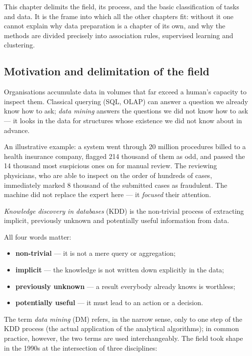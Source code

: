 \documentclass[11pt,a4paper]{article}
\theoremstyle{definition}
\begin{document}
This chapter delimits the field, its process, and the basic classification of tasks and data.
It is the frame into which all the other chapters fit: without it one cannot explain why data
preparation is a chapter of its own, and why the methods are divided precisely into association
rules, supervised learning and clustering.

\subsection{Motivation and delimitation of the field}

Organisations accumulate data in volumes that far exceed a human's capacity to inspect them.
Classical querying (SQL, OLAP) can answer a question we already know how to ask;
\emph{data mining} answers the questions we did not know how to ask --- it looks in the
data for structures whose existence we did not know about in advance.

An illustrative example: a system went through 20 million procedures billed to a health
insurance company, flagged 214 thousand of them as odd, and passed the 14 thousand most
suspicious ones on for manual review. The reviewing physicians, who are able to inspect on the
order of hundreds of cases, immediately marked 8 thousand of the submitted cases as fraudulent.
The machine did not replace the expert here --- it \emph{focused} their attention.

\begin{defbox}
\emph{Knowledge discovery in databases} (KDD) is the non-trivial process of extracting implicit,
previously unknown and potentially useful information from data.

All four words matter:
\begin{itemize}
\item \textbf{non-trivial} --- it is not a mere query or aggregation;
\item \textbf{implicit} --- the knowledge is not written down explicitly in the data;
\item \textbf{previously unknown} --- a result everybody already knows is worthless;
\item \textbf{potentially useful} --- it must lead to an action or a decision.
\end{itemize}
\end{defbox}

The term \emph{data mining} (DM) refers, in the narrow sense, only to one step of the KDD
process (the actual application of the analytical algorithms); in common practice, however, the
two terms are used interchangeably. The field took shape in the 1990s at the intersection of
three disciplines:
\end{document}
